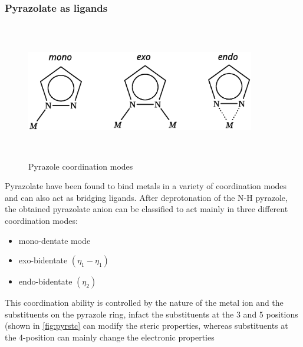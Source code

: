 \documentclass[../Master.tex]{subfiles}
\begin{document}
\subsubsection{Pyrazolate as ligands}
\begin{figure}[h]
	\centering
	\includegraphics[width=10cm,height=6cm,keepaspectratio]{Structures/pyrazolecordmode.eps}
	\caption{Pyrazole coordination modes}\label{fig:pyrazole-cord-mode}
\end{figure}
Pyrazolate have been found to bind metals in a variety of coordination modes and can also act as bridging ligands.
After deprotonation of the N-H pyrazole, the obtained pyrazolate anion can be classified to act mainly in three different coordination modes:
\begin{itemize}
	\item  mono-dentate mode
	\item exo-bidentate \((\eta_{1}-\eta_{1})\)
	\item endo-bidentate \((\eta_{2})\)
\end{itemize}
This coordination ability is controlled by the nature of the metal ion and the substituents on the pyrazole ring, infact the substituents at the 3 and 5 positions (shown in \ref{fig:pyrstc} can modify the steric properties, whereas substituents at the 4-position can mainly change the electronic properties
\end{document}
